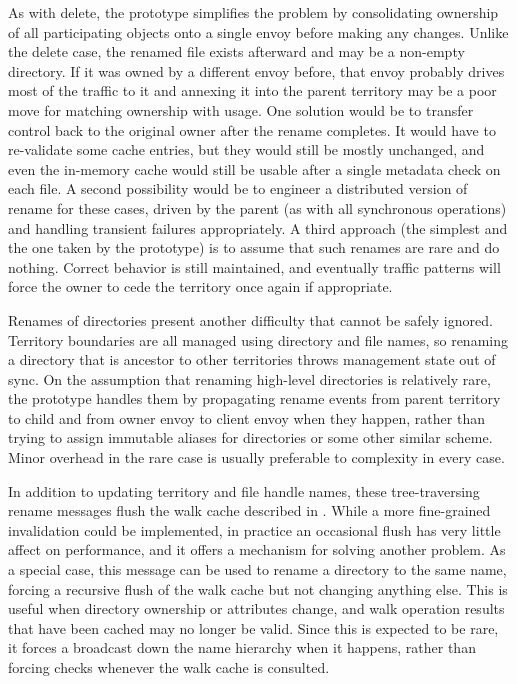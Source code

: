 As with delete, the prototype simplifies the problem by consolidating ownership of all participating objects onto a single envoy before making any changes. Unlike the delete case, the renamed file exists afterward and may be a non-empty directory. If it was owned by a different envoy before, that envoy probably drives most of the traffic to it and annexing it into the parent territory may be a poor move for matching ownership with usage. One solution would be to transfer control back to the original owner after the rename completes. It would have to re-validate some cache entries, but they would still be mostly unchanged, and even the in-memory cache would still be usable after a single metadata check on each file. A second possibility would be to engineer a distributed version of rename for these cases, driven by the parent (as with all synchronous operations) and handling transient failures appropriately. A third approach (the simplest and the one taken by the prototype) is to assume that such renames are rare and do nothing. Correct behavior is still maintained, and eventually traffic patterns will force the owner to cede the territory once again if appropriate.

Renames of directories present another difficulty that cannot be safely ignored. Territory boundaries are all managed using directory and file names, so renaming a directory that is ancestor to other territories throws management state out of sync. On the assumption that renaming high-level directories is relatively rare, the prototype handles them by propagating rename events from parent territory to child and from owner envoy to client envoy when they happen, rather than trying to assign immutable aliases for directories or some other similar scheme. Minor overhead in the rare case is usually preferable to complexity in every case.

In addition to updating territory and file handle names, these tree-traversing rename messages flush the walk cache described in .  While a more fine-grained invalidation could be implemented, in practice an occasional flush has very little affect on performance, and it offers a mechanism for solving another problem. As a special case, this message can be used to rename a directory to the same name, forcing a recursive flush of the walk cache but not changing anything else. This is useful when directory ownership or attributes change, and walk operation results that have been cached may no longer be valid. Since this is expected to be rare, it forces a broadcast down the name hierarchy when it happens, rather than forcing checks whenever the walk cache is consulted.

